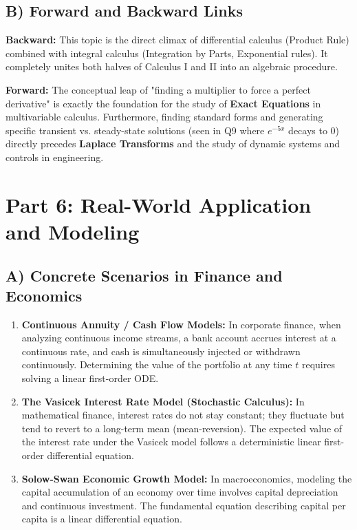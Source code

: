 \documentclass[11pt]{article}
\begin{document}
\subsection{B) Forward and Backward Links}
\textbf{Backward:} This topic is the direct climax of differential calculus (Product Rule) combined with integral calculus (Integration by Parts, Exponential rules). It completely unites both halves of Calculus I and II into an algebraic procedure.

\textbf{Forward:} The conceptual leap of "finding a multiplier to force a perfect derivative" is exactly the foundation for the study of \textbf{Exact Equations} in multivariable calculus. Furthermore, finding standard forms and generating specific transient vs. steady-state solutions (seen in Q9 where $e^{-5x}$ decays to 0) directly precedes \textbf{Laplace Transforms} and the study of dynamic systems and controls in engineering.

\section{Part 6: Real-World Application and Modeling}

\subsection{A) Concrete Scenarios in Finance and Economics}
\begin{enumerate}
    \item \textbf{Continuous Annuity / Cash Flow Models:} In corporate finance, when analyzing continuous income streams, a bank account accrues interest at a continuous rate, and cash is simultaneously injected or withdrawn continuously. Determining the value of the portfolio at any time $t$ requires solving a linear first-order ODE.
    \item \textbf{The Vasicek Interest Rate Model (Stochastic Calculus):} In mathematical finance, interest rates do not stay constant; they fluctuate but tend to revert to a long-term mean (mean-reversion). The expected value of the interest rate under the Vasicek model follows a deterministic linear first-order differential equation.
    \item \textbf{Solow-Swan Economic Growth Model:} In macroeconomics, modeling the capital accumulation of an economy over time involves capital depreciation and continuous investment. The fundamental equation describing capital per capita is a linear differential equation.
\end{enumerate}
\end{document}
